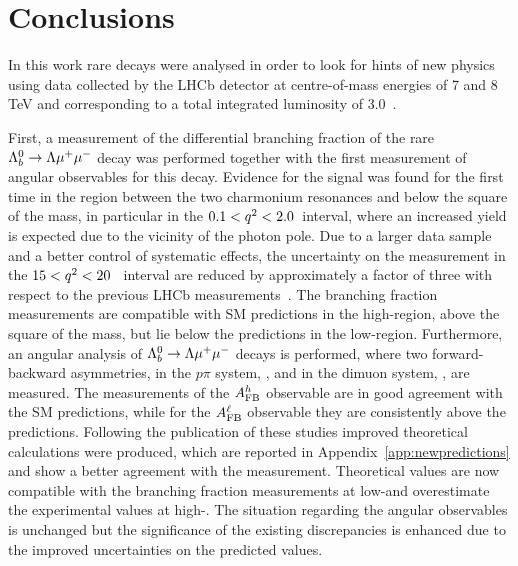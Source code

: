 \chapter{Conclusions}

In this work rare decays were analysed in order to look for hints of new physics using data collected by the LHCb 
detector at centre-of-mass energies of 7 and 8 TeV and corresponding to a total integrated luminosity of 3.0~\invfb.

First, a measurement of the differential branching fraction of the rare $\Lambda^0_b\rightarrow\Lambda\mu^+\mu^-$ decay was performed together
with the first measurement of angular observables for this decay.
Evidence for the signal was found for the first time in the \qsq region between the two charmonium resonances and 
below the square of the \jpsi mass, in particular in the $0.1 < q^2 < 2.0$~\gevgevcccc interval, 
where an increased yield is expected due to the vicinity of the photon pole. 
Due to a larger data sample and a better control of systematic effects, the uncertainty on the measurement in the $15 < q^2 < 20$~\gevgevcccc
interval are reduced by approximately a factor of three with respect to the previous LHCb measurements~\cite{LHCb-PAPER-2013-025}. 
The branching fraction measurements are compatible with SM predictions in the high-\qsq region, above the square
 of the \jpsi mass, but lie below the predictions in the low-\qsq region. Furthermore, an angular analysis of $\Lambda^0_b\rightarrow\Lambda\mu^+\mu^-$ decays
 is performed, where two forward-backward asymmetries, in the $p\pi$ system, \afbh, and in the dimuon system, \afbl, are measured. The measurements
 of the $A_{\rm FB}^h$ observable are in good agreement with the SM predictions, while for the $A_{\rm FB}^\ell$ observable
 they are consistently above the predictions. Following the publication of these studies improved theoretical calculations 
 were produced, which are reported in Appendix~\ref{app:newpredictions} and show a better agreement with the measurement. 
 Theoretical values are now compatible
 with the branching fraction measurements at low-\qsq and overestimate the experimental 
 values at high-\qsq. The situation regarding the angular observables is unchanged but the 
 significance of the existing discrepancies is enhanced due to the improved uncertainties on the predicted values.
 
